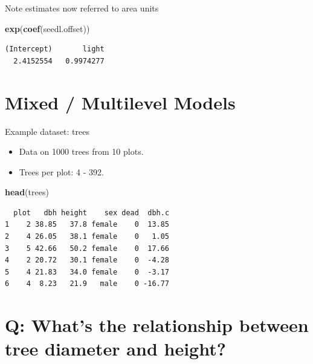 \documentclass[10pt,ignorenonframetext,]{beamer}
\newenvironment{Shaded}{\begin{snugshade}}{\end{snugshade}}
\newcommand{\KeywordTok}[1]{\textcolor[rgb]{0.13,0.29,0.53}{\textbf{{#1}}}}
\newcommand{\NormalTok}[1]{{#1}}
\begin{document}
\begin{frame}[fragile]{Note estimates now referred to area units}

\begin{Shaded}
\begin{Highlighting}[]
\KeywordTok{exp}\NormalTok{(}\KeywordTok{coef}\NormalTok{(seedl.offset))}
\end{Highlighting}
\end{Shaded}

\begin{verbatim}
(Intercept)       light 
  2.4152554   0.9974277 
\end{verbatim}

\end{frame}

\section{Mixed / Multilevel Models}\label{mixed-multilevel-models}

\begin{frame}[fragile]{Example dataset: trees}

\begin{itemize}[<+->]
\item
  Data on 1000 trees from 10 plots.
\item
  Trees per plot: 4 - 392.
\end{itemize}

\begin{Shaded}
\begin{Highlighting}[]
\KeywordTok{head}\NormalTok{(trees)}
\end{Highlighting}
\end{Shaded}

\begin{verbatim}
  plot   dbh height    sex dead  dbh.c
1    2 38.85   37.8 female    0  13.85
2    4 26.05   38.1 female    0   1.05
3    5 42.66   50.2 female    0  17.66
4    2 20.72   30.1 female    0  -4.28
5    4 21.83   34.0 female    0  -3.17
6    4  8.23   21.9   male    0 -16.77
\end{verbatim}

\end{frame}

\section{Q: What's the relationship between tree diameter and
height?}\label{q-whats-the-relationship-between-tree-diameter-and-height}
\end{document}
